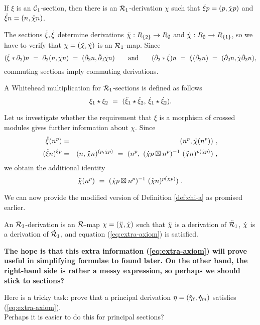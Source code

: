 \begin{lem}
If $\xi$ is an $\mathcal{C}_1$-section, then there is an $\mathcal{R}_1$-derivation $\chi$
such that $\dot{\xi} p = (p, \dot{\chi} p)$  and  $\ddot{\xi} n = (n, \ddot{\chi} n)$.
\end{lem}
\begin{pf}
The sections $\ddot{\xi}, \dot{\xi}$ determine derivations 
$\ddot{\chi} : R_{\{2\}} \to R_{\emptyset}$ and 
$\dot{\chi} : R_{\emptyset} \to R_{\{1\}}$, so we have to verify
that $\chi = (\ddot{\chi},\dot{\chi})$ is an $\mathcal{R}_1$-map.
Since
$$
(\ddot{\xi} * \bar{\partial}_2) n 
    ~=~  \bar{\partial}_2(n, \ddot{\chi} n) 
    ~=~ (\dot{\partial}_2 n, \ddot{\partial}_2 \ddot{\chi} n) 
\qquad\mbox{and}\qquad
(\dot{\partial}_2 * \dot{\xi}) n
    ~=~  \dot{\xi}(\dot{\partial}_2 n)
    ~=~(\dot{\partial}_2 n, \dot{\chi} \dot{\partial}_2 n),
$$
commuting sections imply commuting derivations.
\end{pf}

\begin{defn} 
A Whitehead multiplication for $\mathcal{R}_1$-sections is defined as follows 
$$
\xi_1 \star \xi_2 ~=~ ( \ddot{\xi}_1 \star \ddot{\xi}_2,\, \dot{\xi}_1 \star \dot{\xi}_2). 
$$ 
\end{defn}


\medskip
Let us investigate whether the requirement that $\xi$ is a morphism 
of crossed modules gives further information about $\chi$.
Since
\begin{eqnarray*}
\ddot{\xi}(n^p)
& = &  (n^p,\ddot{\chi}(n^p))~, \\
(\ddot{\xi} n)^{\dot{\xi} p}
& = &  (n, \ddot{\chi} n)^{(p, \dot{\chi} p)} 
~ = ~  (n^p,~(\dot{\chi} p \boxtimes n^p)^{-1}~(\ddot{\chi} n)^{p(\dot{\chi} p)})~,
\end{eqnarray*}
we obtain the additional identity
\begin{equation} \label{eq:extra-axiom}
\ddot{\chi}(n^p) ~=~ (\dot{\chi} p \boxtimes n^p)^{-1}~(\ddot{\chi} n)^{p(\dot{\chi} p)})~.
\end{equation}

We can now provide the modified version of Definition \ref{def:chi-a}
as promised earlier.

\begin{defn} \label{def:chi-b}
An $\mathcal{R}_1$-derivation is an $\mathcal{R}$-map $\chi = (\ddot{\chi}, \dot{\chi})$ 
such that $\ddot{\chi}$ is a derivation of $\ddot{\mathcal{R}}_1$, 
$\dot{\chi}$ is a derivation of $\dot{\mathcal{R}}_1$,
and equation (\ref{eq:extra-axiom}) is satisfied.
\end{defn}

\bigskip
{\bf The hope is that this extra information (\ref{eq:extra-axiom}) 
will prove useful in simplifying formulae to found later.
On the other hand, the right-hand side is rather a messy expression,
so perhaps we should stick to sections?

\medskip
Here is a tricky task: prove that a principal derivation
$\eta = (\ddot{\eta}_{\ell},\dot{\eta}_m)$ satisfies (\ref{eq:extra-axiom}).\\
Perhaps it is easier to do this for principal sections?}


